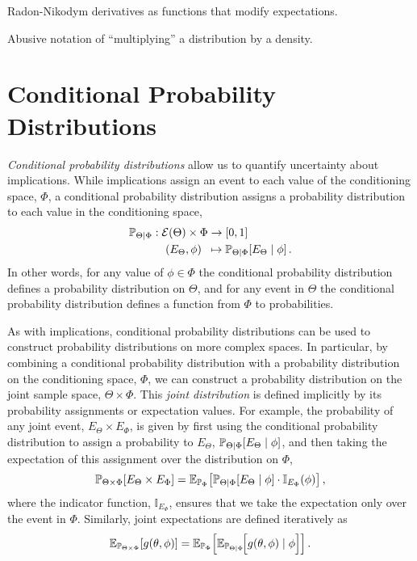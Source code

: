 Radon-Nikodym derivatives as functions that modify expectations.

Abusive notation of ``multiplying'' a distribution by a density.

\section{Conditional Probability Distributions}

\emph{Conditional probability distributions} allow us to quantify uncertainty
about implications.  While implications assign an event to each value of the 
conditioning space, $\Phi$, a conditional probability distribution assigns a 
probability distribution to each value in the conditioning space,
%
\begin{align*}
\mathbb{P}_{\Theta \mid \Phi} 
&:  \mathcal{E} \! \left( \Theta \right)  \times \Phi \rightarrow \left[0, 1 \right] \\
&\quad \left( E_{\Theta}, \phi \right) \;\; \mapsto 
\mathbb{P}_{\Theta \mid \Phi} \! \left[ E_{\Theta} \mid \phi \right].
\end{align*}
%
In other words, for any value of $\phi \in \Phi$ the conditional probability
distribution defines a probability distribution on $\Theta$, and for any
event in $\Theta$ the conditional probability distribution defines a 
function from $\Phi$ to probabilities.  

As with implications, conditional probability distributions can be used
to construct probability distributions on more complex spaces.  In particular,
by combining a conditional probability distribution with a probability distribution 
on the conditioning space, $\Phi$, we can construct a probability distribution 
on the joint sample space, $\Theta \times \Phi$.  This \emph{joint distribution} 
is defined implicitly by its probability assignments or expectation values.  
For example, the probability of any joint event, $E_{\Theta} \times E_{\Phi}$, 
is given by first using the conditional probability distribution to assign a probability 
to $E_{\Theta}$, $\mathbb{P}_{\Theta|\Phi} \! \left[ E_{\Theta} \mid \phi \right]$, and then 
taking the expectation of this assignment over the distribution on $\Phi$,
%
\begin{equation*}
\mathbb{P}_{\Theta \times \Phi} \! \left[ E_{\Theta} \times E_{\Phi} \right]
=
\mathbb{E}_{\mathbb{P}_{\Phi}} \! \left[  
\mathbb{P}_{\Theta|\Phi} \! \left[ E_{\Theta} \mid \phi \right] 
\cdot \mathbb{I}_{E_{\Phi}} \! \left( \phi \right)
\right],
\end{equation*}
%
where the indicator function, $\mathbb{I}_{E_{\Phi}}$, ensures that we 
take the expectation only over the event in $\Phi$.  Similarly, joint 
expectations are defined iteratively as
%
\begin{equation*}
\mathbb{E}_{\mathbb{P}_{\Theta \times \Phi}} \! \left[ g \! \left( \theta, \phi \right) \right]
=
\mathbb{E}_{\mathbb{P}_{\Phi}} \! \left[  
\mathbb{E}_{\mathbb{P}_{\Theta|\Phi}} \! \Big[ 
g \! \left( \theta, \phi \right) \mid \phi 
\Big]
\right].
\end{equation*}


